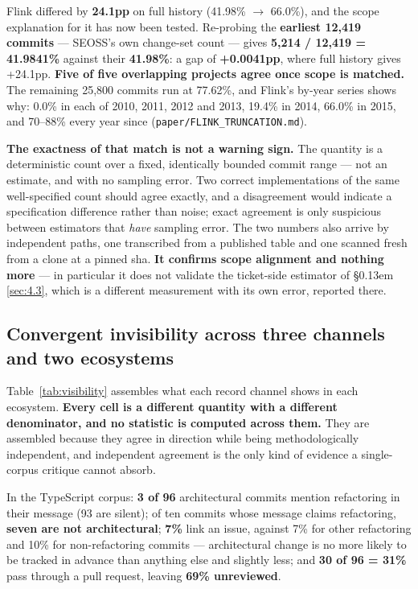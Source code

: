\documentclass[conference]{IEEEtran}
\begin{document}
Flink differed by \textbf{24.1pp} on full history (41.98\% $\rightarrow$ 66.0\%), and the scope explanation for it has now been tested. Re-probing the \textbf{earliest 12,419 commits} --- SEOSS's own change-set count --- gives \textbf{5,214 / 12,419 = 41.9841\%} against their \textbf{41.98\%}: a gap of \textbf{+0.0041pp}, where full history gives +24.1pp. \textbf{Five of five overlapping projects agree once scope is matched.} The remaining 25,800 commits run at 77.62\%, and Flink's by-year series shows why: 0.0\% in each of 2010, 2011, 2012 and 2013, 19.4\% in 2014, 66.0\% in 2015, and 70--88\% every year since (\texttt{paper/\allowbreak{}FLINK\_\allowbreak{}TRUNCATION.\allowbreak{}md}).

\textbf{The exactness of that match is not a warning sign.} The quantity is a deterministic count over a fixed, identically bounded commit range --- not an estimate, and with no sampling error. Two correct implementations of the same well-specified count should agree exactly, and a disagreement would indicate a specification difference rather than noise; exact agreement is only suspicious between estimators that \emph{have} sampling error. The two numbers also arrive by independent paths, one transcribed from a published table and one scanned fresh from a clone at a pinned sha. \textbf{It confirms scope alignment and nothing more} --- in particular it does not validate the ticket-side estimator of \S\kern0.13em \ref{sec:4.3}, which is a different measurement with its own error, reported there.

\subsection{Convergent invisibility across three channels and two ecosystems}
\label{sec:4.5}

Table~\ref{tab:visibility} assembles what each record channel shows in each ecosystem. \textbf{Every cell is a different quantity with a different denominator, and no statistic is computed across them.} They are assembled because they agree in direction while being methodologically independent, and independent agreement is the only kind of evidence a single-corpus critique cannot absorb.

In the TypeScript corpus: \textbf{3 of 96} architectural commits mention refactoring in their message (93 are silent); of ten commits whose message claims refactoring, \textbf{seven are not architectural}; \textbf{7\%} link an issue, against 7\% for other refactoring and 10\% for non-refactoring commits --- architectural change is no more likely to be tracked in advance than anything else and slightly less; and \textbf{30 of 96 = 31\%} pass through a pull request, leaving \textbf{69\% unreviewed}.
\end{document}
